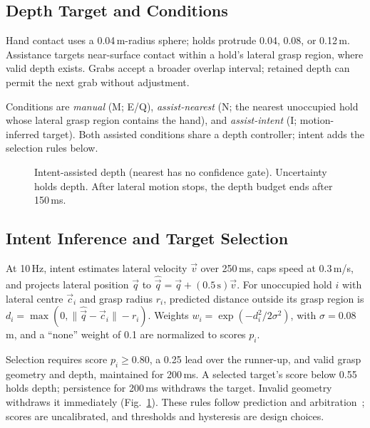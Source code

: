 \subsection{Depth Target and Conditions}
Hand contact uses a 0.04\,m-radius sphere; holds protrude 0.04, 0.08, or
0.12\,m. Assistance targets near-surface contact within a hold's lateral grasp
region, where valid depth exists. Grabs accept a broader overlap interval;
retained depth can permit the next grab without adjustment.

Conditions are \emph{manual} (M; E/Q), \emph{assist-nearest}
(N; the nearest unoccupied hold whose lateral grasp region contains the hand),
and \emph{assist-intent} (I; motion-inferred target). Both assisted conditions
share a depth controller; intent adds the selection rules below.

\begin{figure}[!t]
\centering

\caption{Intent-assisted depth (nearest has no confidence gate). Uncertainty holds
depth. After lateral motion stops, the depth budget ends after 150\,ms.}
\label{fig:gate}
\end{figure}

\subsection{Intent Inference and Target Selection}
At 10\,Hz, intent estimates lateral velocity $\vec{v}$ over 250\,ms,
caps speed at 0.3\,m/s, and projects lateral position
$\vec{q}$ to $\hat{\vec{q}}=\vec{q}+(0.5\,\mathrm{s})\vec{v}$.
For unoccupied hold $i$ with lateral centre $\vec{c}_i$ and grasp radius
$r_i$, predicted distance outside its grasp region is
$d_i=\max(0,\|\hat{\vec{q}}-\vec{c}_i\|-r_i)$.
Weights $w_i=\exp(-d_i^2/2\sigma^2)$, with $\sigma=0.08$\,m, and a
``none'' weight of 0.1 are normalized to scores $p_i$.

Selection requires score $p_i\ge0.80$, a 0.25 lead over the runner-up,
and valid grasp geometry and depth, maintained for 200\,ms. A selected target's
score below 0.55 holds depth; persistence for 200\,ms withdraws the target.
Invalid geometry withdraws it immediately (Fig.~\ref{fig:gate}). These rules
follow prediction and arbitration~\cite{dragan2013policy,javdani2015shared};
scores are uncalibrated, and thresholds and hysteresis are design choices.

